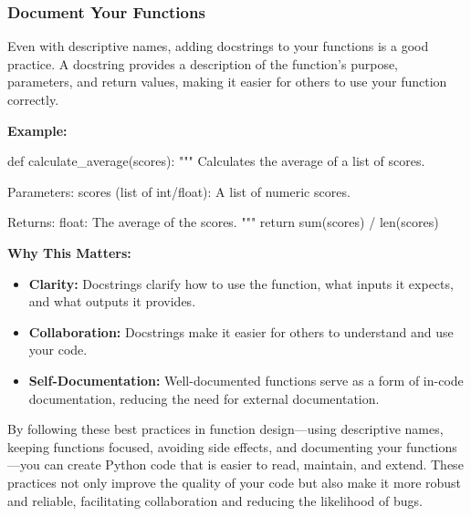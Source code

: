 \documentclass[
  letterpaper,
  DIV=11,
  numbers=noendperiod]{scrreprt}
\newenvironment{Shaded}{\begin{snugshade}}{\end{snugshade}}
\newcommand{\BuiltInTok}[1]{\textcolor[rgb]{0.00,0.23,0.31}{#1}}
\newcommand{\CommentTok}[1]{\textcolor[rgb]{0.37,0.37,0.37}{#1}}
\newcommand{\ControlFlowTok}[1]{\textcolor[rgb]{0.00,0.23,0.31}{#1}}
\newcommand{\KeywordTok}[1]{\textcolor[rgb]{0.00,0.23,0.31}{#1}}
\newcommand{\NormalTok}[1]{\textcolor[rgb]{0.00,0.23,0.31}{#1}}
\newcommand{\OperatorTok}[1]{\textcolor[rgb]{0.37,0.37,0.37}{#1}}
\providecommand{\tightlist}{%
  \setlength{\itemsep}{0pt}\setlength{\parskip}{0pt}}\usepackage{longtable,booktabs,array}
\begin{document}
\hypertarget{document-your-functions}{%
\subsubsection{Document Your Functions}\label{document-your-functions}}

Even with descriptive names, adding docstrings to your functions is a
good practice. A docstring provides a description of the function's
purpose, parameters, and return values, making it easier for others to
use your function correctly.

\textbf{Example:}

\begin{Shaded}
\begin{Highlighting}[]
\KeywordTok{def}\NormalTok{ calculate\_average(scores):}
    \CommentTok{"""}
\CommentTok{    Calculates the average of a list of scores.}

\CommentTok{    Parameters:}
\CommentTok{    scores (list of int/float): A list of numeric scores.}

\CommentTok{    Returns:}
\CommentTok{    float: The average of the scores.}
\CommentTok{    """}
    \ControlFlowTok{return} \BuiltInTok{sum}\NormalTok{(scores) }\OperatorTok{/} \BuiltInTok{len}\NormalTok{(scores)}
\end{Highlighting}
\end{Shaded}

\textbf{Why This Matters:}

\begin{itemize}
\tightlist
\item
  \textbf{Clarity:} Docstrings clarify how to use the function, what
  inputs it expects, and what outputs it provides.
\item
  \textbf{Collaboration:} Docstrings make it easier for others to
  understand and use your code.
\item
  \textbf{Self-Documentation:} Well-documented functions serve as a form
  of in-code documentation, reducing the need for external
  documentation.
\end{itemize}

By following these best practices in function design---using descriptive
names, keeping functions focused, avoiding side effects, and documenting
your functions---you can create Python code that is easier to read,
maintain, and extend. These practices not only improve the quality of
your code but also make it more robust and reliable, facilitating
collaboration and reducing the likelihood of bugs.
\end{document}
